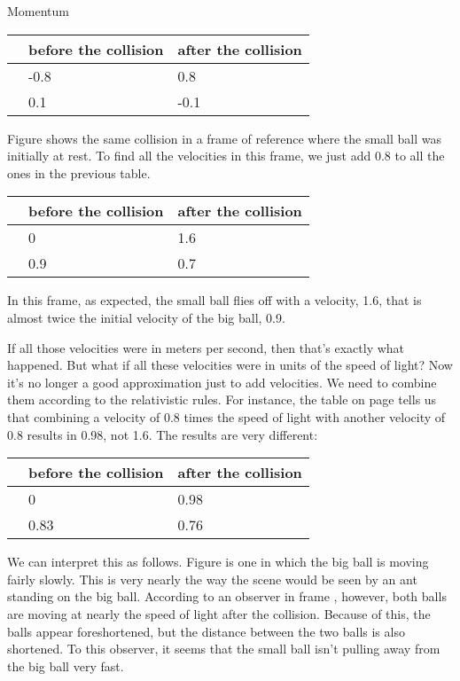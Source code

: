 \begin{envsubsection}{Momentum}
\newcommand{\smallvelocitytable}[6]{%
\noindent\hspace{5mm}\begin{tabular}{|p{4mm}|p{40mm}|p{40mm}|}
\hline
 & before the collision
       & after the collision  \\
\hline
\anonymousinlinefig{#5} & #1 & #2  \\
\anonymousinlinefig{#6} & #3 & #4  \\
\hline
\end{tabular}
}

\smallvelocitytable{-0.8}{0.8}{0.1}{-0.1}{smallball}{bigball}

Figure  shows the same collision in a frame of reference where
the small ball was initially at rest.
 To find all the velocities in this frame, we
just add 0.8 to all the ones in the previous table.

\smallvelocitytable{0}{1.6}{0.9}{0.7}{smallball}{bigball}

\noindent In this frame, as expected, the small ball flies off with a velocity, 1.6, that
is almost twice the initial velocity of the big ball, 0.9.

If all those velocities were in meters per second, then that's exactly what happened. But
what if all these velocities were in units of the speed of light? Now it's no longer a good
approximation just to add velocities. We need to combine them according to the relativistic
rules. For instance, the table
on page \pageref{fig:veltableb} tells us that combining a velocity of 0.8 times the
speed of light with another velocity of 0.8 results in 0.98, not 1.6. The results are very different:

\smallvelocitytable{0}{0.98}{0.83}{0.76}{smallball}{bigball}


We can interpret this as follows. Figure  is one in which the
big ball is moving fairly slowly. This is very nearly the way the scene would be seen by an
ant standing on the big ball. According to an observer in frame , however,
both balls are moving at nearly the speed of light after the collision. Because of this, the
balls appear foreshortened, but the distance between the two balls is also shortened. To this
observer, it seems that the small ball isn't pulling away from the big ball very fast.


\end{envsubsection}
